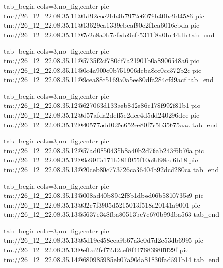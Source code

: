 \ifcmt
  tab_begin cols=3,no_fig,center
    pic tm://26_12_22.08.35.11@1d92cae2bb4b7972e6079b40be9d4586
    pic tm://26_12_22.08.35.11@13629ea1339cbeaf90e2f1ca6016ebda
    pic tm://26_12_22.08.35.11@7c2e8a0b7cfedc9cfe5311f8a0bc44db
  tab_end
\fi


\ifcmt
  tab_begin cols=3,no_fig,center
    pic tm://26_12_22.08.35.11@5735f2cf780df7a21901b0a8906548a6
    pic tm://26_12_22.08.35.11@0e4a900c0b751906dcba8ec0ce372b2e
    pic tm://26_12_22.08.35.11@9cea88c5169a0a5ee80dfa284cfd9acf
  tab_end
\fi


\ifcmt
  tab_begin cols=3,no_fig,center
    pic tm://26_12_22.08.35.12@627063d133aeb842e86c178f992f81b1
    pic tm://26_12_22.08.35.12@d57afda2deff5e2dcc4d5dd240296dce
    pic tm://26_12_22.08.35.12@40577add025c652ee80f7c5b35675aaa
  tab_end
\fi


\ifcmt
  tab_begin cols=3,no_fig,center
    pic tm://26_12_22.08.35.12@57ad0850435b8a40b2d76ab243f6b76a
    pic tm://26_12_22.08.35.12@9e99ffa171b381f955f10a9d98ed6b18
    pic tm://26_12_22.08.35.13@20ceb80c773726ca36404b92dcd280ca
  tab_end
\fi


\ifcmt
  tab_begin cols=3,no_fig,center
    pic tm://26_12_22.08.35.13@008ad40b8942f8b1dbed06b5810735e9
    pic tm://26_12_22.08.35.13@32c7f3905d5215013f518a20141a9001
    pic tm://26_12_22.08.35.13@5637e348fba80513bc7c670b99dba563
  tab_end
\fi


\ifcmt
  tab_begin cols=3,no_fig,center
    pic tm://26_12_22.08.35.13@5d19e458cea9b67a3c0d7d2c53db6995
    pic tm://26_12_22.08.35.13@efba2fef72d2cef8f44768368ffff29f
    pic tm://26_12_22.08.35.14@680985985eb07a90da81830fad591b14
  tab_end
\fi

